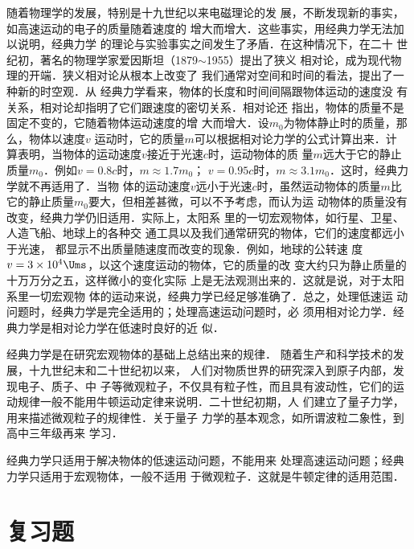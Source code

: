     随着物理学的发展，特别是十九世纪以来电磁理论的发
展，不断发现新的事实，如高速运动的电子的质量随着速度的
增大而增大．这些事实，用经典力学无法加以说明，经典力学
的理论与实验事实之间发生了矛盾．在这种情况下，在二十
世纪初，著名的物理学家爱因斯坦（1879$\sim$1955）提出了狭义
相对论，成为现代物理的开端．狭义相对论从根本上改变了
我们通常对空间和时间的看法，提出了一种新的时空观．从
经典力学看来，物体的长度和时间间隔跟物体运动的速度没
有关系，相对论却指明了它们跟速度的密切关系．相对论还
指出，物体的质量不是固定不变的，它随着物体运动速度的增
大而增大．设$m_0$为物体静止时的质量，那么，物体以速度$v$
运动时，它的质量$m$可以根据相对论力学的公式计算出来．计
算表明，当物体的运动速度$v$接近于光速$c$时，运动物体的质
量$m$远大于它的静止质量$m_0$．例如$v=0.8c$时，$m\approx 1.7m_0$；
$v=0.95c$时，$m\approx 3.1m_0$．这时，经典力学就不再适用了．当物
体的运动速度$v$远小于光速$c$时，虽然运动物体的质量$m$比
它的静止质量$m_0$要大，但相差甚微，可以不予考虑，而认为运
动物体的质量没有改变，经典力学仍旧适用．实际上，太阳系
里的一切宏观物体，如行星、卫星、人造飞船、地球上的各种交
通工具以及我们通常研究的物体，它们的速度都远小于光速，
都显示不出质量随速度而改变的现象．例如，地球的公转速
度$v=3\times 10^4\Ums$，以这个速度运动的物体，它的质量的改
变大约只为静止质量的十万万分之五，这样微小的变化实际
上是无法观测出来的．这就是说，对于太阳系里一切宏观物
体的运动来说，经典力学已经足够准确了．总之，处理低速运
动问题时，经典力学是完全适用的；处理高速运动问题时，必
须用相对论力学．经典力学是相对论力学在低速时良好的近
似．

    经典力学是在研究宏观物体的基础上总结出来的规律．
随着生产和科学技术的发展，十九世纪末和二十世纪初以来，
人们对物质世界的研究深入到原子内部，发现电子、质子、中
子等微观粒子，不仅具有粒子性，而且具有波动性，它们的运
动规律一般不能用牛顿运动定律来说明．二十世纪初期，人
们建立了量子力学，用来描述微观粒子的规律性．关于量子
力学的基本观念，如所谓波粒二象性，到高中三年级再来
学习．

经典力学只适用于解决物体的低速运动问题，不能用来
处理高速运动问题；经典力学只适用于宏观物体，一般不适用
于微观粒子．这就是牛顿定律的适用范围．

\section*{复习题}

